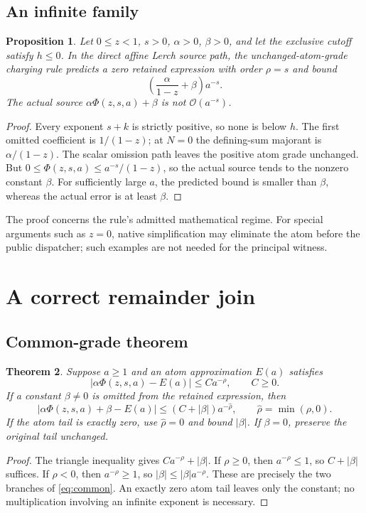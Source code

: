 \documentclass[11pt,letterpaper]{article}
\newcommand{\OO}{\mathcal{O}}
\newtheorem{theorem}{Theorem}[section]
\newtheorem{proposition}[theorem]{Proposition}
\begin{document}
\subsection{An infinite family}
\begin{proposition}
Let $0\le z<1$, $s>0$, $\alpha>0$, $\beta>0$, and let the exclusive cutoff
satisfy $h\le0$. In the direct affine Lerch source path, the unchanged-atom-grade
charging rule predicts a zero retained expression with order $\rho=s$ and
bound
\[
 \left(\frac{\alpha}{1-z}+\beta\right)a^{-s}.
\]
The actual source $\alpha\Phi(z,s,a)+\beta$ is not $\OO(a^{-s})$.
\end{proposition}
\begin{proof}
Every exponent $s+k$ is strictly positive, so none is below $h$. The first
omitted coefficient is $1/(1-z)$; at $N=0$ the defining-sum majorant is
$\alpha/(1-z)$. The scalar omission path leaves the positive atom grade
unchanged. But
$0\le\Phi(z,s,a)\le a^{-s}/(1-z)$, so the actual source tends to the nonzero
constant $\beta$. For sufficiently large $a$, the predicted bound is smaller
than $\beta$, whereas the actual error is at least $\beta$.
\end{proof}
The proof concerns the rule's admitted mathematical regime. For special
arguments such as $z=0$, native simplification may eliminate the atom before
the public dispatcher; such examples are not needed for the principal witness.

\section{A correct remainder join}
\subsection{Common-grade theorem}
\begin{theorem}\label{th:join}
Suppose $a\ge1$ and an atom approximation $E(a)$ satisfies
\[
 |\alpha\Phi(z,s,a)-E(a)|\le C a^{-\rho},\qquad C\ge0.
\]
If a constant $\beta\ne0$ is omitted from the retained expression, then
\begin{equation}\label{eq:common}
 |\alpha\Phi(z,s,a)+\beta-E(a)|
 \le (C+|\beta|)a^{-\widehat\rho},\qquad
 \widehat\rho=\min(\rho,0).
\end{equation}
If the atom tail is exactly zero, use $\widehat\rho=0$ and bound $|\beta|$.
If $\beta=0$, preserve the original tail unchanged.
\end{theorem}
\begin{proof}
The triangle inequality gives $Ca^{-\rho}+|\beta|$. If $\rho\ge0$, then
$a^{-\rho}\le1$, so $C+|\beta|$ suffices. If $\rho<0$, then
$a^{-\rho}\ge1$, so $|\beta|\le|\beta|a^{-\rho}$. These are precisely the two
branches of \eqref{eq:common}. An exactly zero atom tail leaves only the
constant; no multiplication involving an infinite exponent is necessary.
\end{proof}
\end{document}
